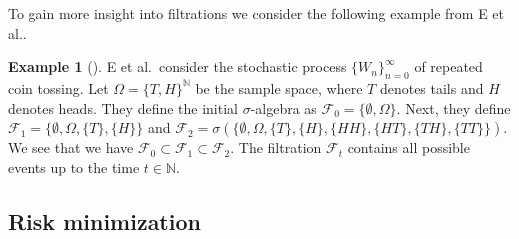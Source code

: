 \documentclass[12pt]{article}
\theoremstyle{definition}
\newtheorem{example}[example]{Example}
\numberwithin{equation}{section}
\newcommand{\N}{\mathbb{N}}
\newcommand{\R}{\mathbb{R}}
\newcommand{\CF}{\mathcal{F}}
\newcommand{\ev}[1]{\mathbb{E}\left[{#1}\right]}
\begin{document}
 To gain more insight into filtrations we consider the following example from E et al.\cite{eAppliedStochasticAnalysis2021}.
 \begin{example}[]
  E et al.\ consider the stochastic process $\{W_n\}_{n=0}^\infty$ of repeated coin tossing. Let $\Omega = \{T,H\}^\N$ be the sample space, where $T$ denotes tails and $H$ denotes heads. They define the initial $\sigma$-algebra as $\CF_0 = \{\emptyset, \Omega\}$. Next, they define $\CF_1 = \{\emptyset, \Omega, \{T\}, \{H\}\}$ and $\CF_2 = \sigma(\{\emptyset, \Omega, \{T\}, \{H\}, \{HH\},\{HT\}, \{TH\},\{TT\}\})$. We see that we have $\CF_0 \subset \CF_1 \subset \CF_2$. The filtration $\CF_t$ contains all possible events up to the time $t \in \N$.
 \end{example}
\subsection{Risk minimization}
\end{document}

